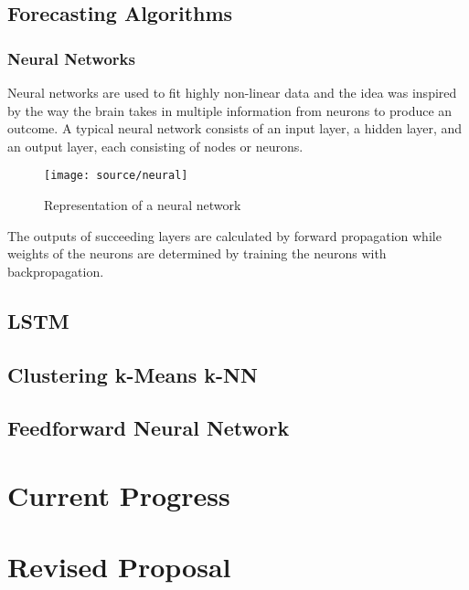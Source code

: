 \documentclass[11pt,twocolumn]{article}
\begin{document}
		\subsection{Forecasting Algorithms}

			\subsubsection*{Neural Networks}
				\quad Neural networks are used to fit highly non-linear data and the idea was inspired by the way the brain takes in multiple information from neurons to produce an outcome. A typical neural network consists of an input layer, a hidden layer, and an output layer, each consisting of nodes or neurons. 

				\begin{figure}[!htbp]
					\centering
					\texttt{[image: source/neural]}
					\caption{Representation of a neural network}
				\end{figure}

				The outputs of succeeding layers are calculated by forward propagation while weights of the neurons are determined by training the neurons with backpropagation. 

				
			

		\subsection{LSTM}

		\subsection{Clustering k-Means k-NN}

		\subsection{Feedforward Neural Network}

	\section{Current Progress}

	\section{Revised Proposal}		
	
	
	
\end{document}
